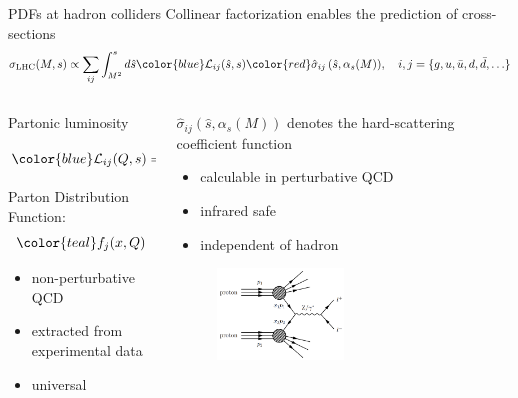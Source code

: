 \documentclass[aspectratio=169, 8pt,t]{beamer}
\begin{document}
\begin{frame}{PDFs at hadron colliders}
  Collinear factorization enables the prediction of cross-sections
  \begin{equation*}
    \sigma_{\mathrm{LHC}}(M, s) \propto \sum_{i j} \int_{M^2}^s d \hat{s} {\color{blue}\mathcal{L}_{i j}(\hat{s}, s)} {\color{red}\hat{\sigma}_{i j}\left(\hat{s}, \alpha_s(M)\right)}, \quad i,j = \{g, u, \bar{u}, d, \bar{d}, \ldots\}
  \end{equation*}

  \begin{columns}
    \begin{column}{0.49\textwidth}
      Partonic luminosity
      \begin{equation*}
        {\color{blue}\mathcal{L}_{i j}(Q, s)}=\frac{1}{s} \int_{Q^2 / s}^1 \frac{d x}{x} {\color{teal}f_i\left(\frac{Q^2}{s x}, Q\right) f_j(x, Q)}
      \end{equation*}
      Parton Distribution Function:
      \begin{equation*}
        {\color{teal} f_j(x,Q)}
      \end{equation*}
      \begin{itemize}
        \item non-perturbative QCD
        \item extracted from experimental data
        \item universal
      \end{itemize}
    \end{column}

    \begin{column}{0.49\textwidth}
      {\color{red} $\hat{\sigma}_{i j}\left(\hat{s}, \alpha_s(M)\right)$} denotes the hard-scattering coefficient function
      \begin{itemize}
        \item calculable in perturbative QCD
        \item infrared safe
        \item independent of hadron
      \end{itemize}
      \begin{figure}
        \includegraphics[width=0.5\textwidth]{figures/dy.png}
      \end{figure}
    \end{column}
  \end{columns}
\end{frame}
\end{document}
